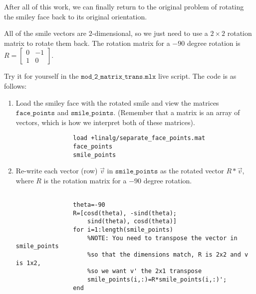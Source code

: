 \documentclass{ximera}
\begin{document}
\begin{exploration}
\begin{remark}
\begin{example}
\begin{hint}
            \end{hint}

        \end{example}

    \end{remark}

    \begin{example}

        After all of this work, we can finally return to the original problem of rotating the smiley face back to its original orientation.

        All of the smile vectors are $2$-dimensional, so we just need to use a $2\times 2$ rotation matrix to rotate them back. The rotation matrix for a $-90$ degree rotation is $R=\begin{bmatrix} 0 & -1 \\ 1 & 0 \end{bmatrix}$.

        Try it for yourself in the $\texttt{mod\_2\_matrix\_trans.mlx}$ live script. The code is as follows:
        \begin{enumerate}

            \item Load the smiley face with the rotated smile and view the matrices $\texttt{face\_points}$ and $\texttt{smile\_points}$. (Remember that a matrix is an array of vectors, which is how we interpret both of these matrices).
            \begin{verbatim}
                load +linalg/separate_face_points.mat
                face_points
                smile_points
            \end{verbatim}

            \item Re-write each vector (row) $\vec{v}$ in $\texttt{smile\_points}$ as the rotated vector $R*\vec{v}$, where $R$ is the rotation matrix for a $-90$ degree rotation.
            
            \begin{verbatim}

                theta=-90
                R=[cosd(theta), -sind(theta);
                    sind(theta), cosd(theta)]
                for i=1:length(smile_points)
                    %NOTE: You need to transpose the vector in smile_points 
                    %so that the dimensions match, R is 2x2 and v is 1x2, 
                    %so we want v' the 2x1 transpose
                    smile_points(i,:)=R*smile_points(i,:)';
                end


\end{verbatim}
\end{enumerate}
\end{example}
\end{exploration}
\end{document}
